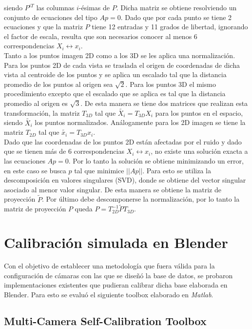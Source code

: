  siendo $P^{iT}$ las columnas $i$-ésimas de $P$. Dicha matriz se obtiene resolviendo un conjunto de ecuaciones del tipo $Ap=0$.  Dado que por cada punto se tiene 2 ecuaciones y que la matriz $P$ tiene 12 entradas y 11 grados de libertad, ignorando el factor de escala, resulta que son necesarios conocer al menos 6 correspondencias $X_i \leftrightarrow x_i$.\\
 
 Tanto a los puntos imagen 2D como a los 3D se les aplica una normalización. Para los puntos 2D de cada vista se traslada el origen de coordenadas de dicha vista al centroide de los puntos y se aplica un escalado tal que la distancia promedio de los puntos al origen sea $\sqrt{2}$. Para los puntos 3D el mismo procedimiento excepto que el escalado que se aplica es tal que la distancia promedio al origen es $\sqrt{3}$. De esta manera se tiene dos matrices que realizan esta transformación, la matriz $T_{3D}$ tal que $\tilde{X_i} = T_{3D}^{}X_i$ para los puntos en el espacio, siendo $\tilde{X_i}$ los puntos normalizados. Análogamente para los 2D imagen se tiene la matriz $T_{2D}^{}$ tal que $\tilde{x_i} = T_{3D}^{}x_i$. \\
 
 Dado que las coordenadas de los puntos 2D están afectadas por el ruido y dado que se tienen más de 6 correspondencias $X_i \leftrightarrow x_i$, no existe una solución exacta a las ecuaciones $Ap=0$. Por lo tanto la solución se obtiene minimizando un error, en este caso se busca $p$ tal que minimice $||Ap||$. Para esto se utiliza la descomposición en valores singulares (SVD), donde se obtiene del vector singular asociado al menor valor singular. De esta manera se obtiene la matriz de proyección $\tilde{P}$. Por último debe descomponerse la normalización, por lo tanto la matriz de proyección $P$ queda $P = T_{2D}^{-1} \tilde{P} T_{3D}^{}$.
 
 \section{Calibración simulada en Blender}
 
 Con el objetivo de establecer una metodología que fuera válida para la configuración de cámaras con las que se diseñó la base de datos, se probaron implementaciones existentes que pudieran calibrar dicha base elaborada en Blender. Para esto se evaluó el siguiente toolbox elaborado en \emph{Matlab}.\\ 
 
  \subsection{ Multi-Camera Self-Calibration Toolbox} 
 

